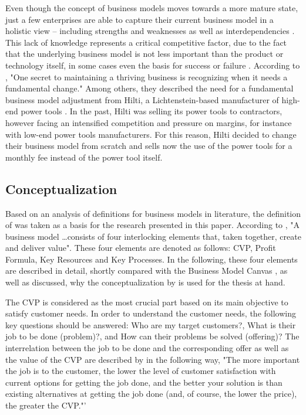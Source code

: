 Even though the concept of business models moves towards a more mature state, just a few enterprises are able to capture their current business model in a holistic view -- including strengths and weaknesses as well as interdependencies \citep[p. 52]{Johnson2008}. This lack of knowledge represents a critical competitive factor, due to the fact that the underlying business model is not less important than the product or technology itself, in some cases even the basis for success or failure . According to \citet[p. 50]{Johnson2008}, "One secret to maintaining a thriving business is recognizing when it needs a fundamental change." Among others, they described the need for a fundamental business model adjustment from Hilti, a Lichtenstein-based manufacturer of high-end power tools \citep[pp. 54-57]{Johnson2008}. In the past, Hilti was selling its power tools to contractors, however facing an intensified competition and pressure on margins, for instance with low-end power tools manufacturers. For this reason, Hilti decided to change their business model from scratch and sells now the use of the power tools for a monthly fee instead of the power tool itself.


\subsection{Conceptualization}\label{ch:sota:bmc}

Based on an analysis of definitions for business models in literature, the definition of \citet{Johnson2008} was taken as a basis for the research presented in this paper. According to \citet[p. 52]{Johnson2008}, "A business model \ldots consists of four interlocking elements that, taken together, create and deliver value". These four elements are denoted as follows: \ac{CVP}, Profit Formula, Key Resources and Key Processes. In the following, these four elements are described in detail, shortly compared with the Business Model Canvas \citep{Osterwalder2010}, as well as discussed, why the conceptualization by \citet{Johnson2008} is used for the thesis at hand.

The \ac{CVP} is considered as the most crucial part based on its main objective to satisfy customer needs. In order to understand the customer needs, the following key questions should be answered: Who are my target customers?, What is their job to be done (problem)?, and How can their problems be solved (offering)? The interrelation between the job to be done and the corresponding offer as well as the value of the \ac{CVP} are described by  \citet[p. 52]{Johnson2008} in the following way, "The more important the job is to the customer, the lower the level of customer satisfaction with current options for getting the job done, and the better your solution is than existing alternatives at getting the job done (and, of course, the lower the price), the greater the CVP."'

